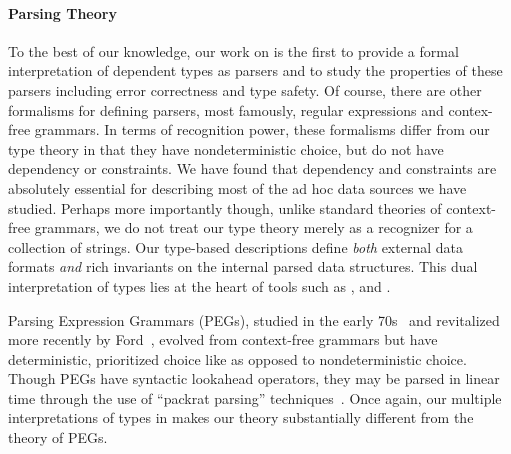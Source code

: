 \paragraph*{Parsing Theory}
To the best of our knowledge, our work on \ddc{} is the first to
provide a formal interpretation of dependent types as parsers and to
study the properties of these parsers including error correctness and
type safety. Of course, there are other formalisms for defining
parsers, most famously, regular expressions and contex-free grammars.
In terms of recognition power, these formalisms differ from our type
theory in that they have nondeterministic choice, but do not have
dependency or constraints.  We have found that dependency and
constraints are absolutely essential for describing most of the ad hoc
data sources we have studied.  Perhaps more importantly though, unlike
standard theories of context-free grammars, we do not treat our type
theory merely as a recognizer for a collection of strings.  Our
type-based descriptions define {\em both} external data formats {\em
  and} rich invariants on the internal parsed data structures.  This
dual interpretation of types lies at the heart of tools such as \pads,
\datascript{} and \packettypes{}.

Parsing Expression Grammars (PEGs), studied in the early
70s~\cite{birman+:parsing} and revitalized more recently by
Ford~\cite{ford:pegs}, evolved from context-free grammars but have
deterministic, prioritized choice like \ddc{} as opposed to
nondeterministic choice.  Though PEGs have syntactic lookahead
operators, they may be parsed in linear time through the use of
``packrat parsing'' techniques~\cite{ford:packrat,grimm:packrat}.
Once again, our multiple interpretations of types in \ddc{} makes our
theory substantially different from the theory of PEGs.

